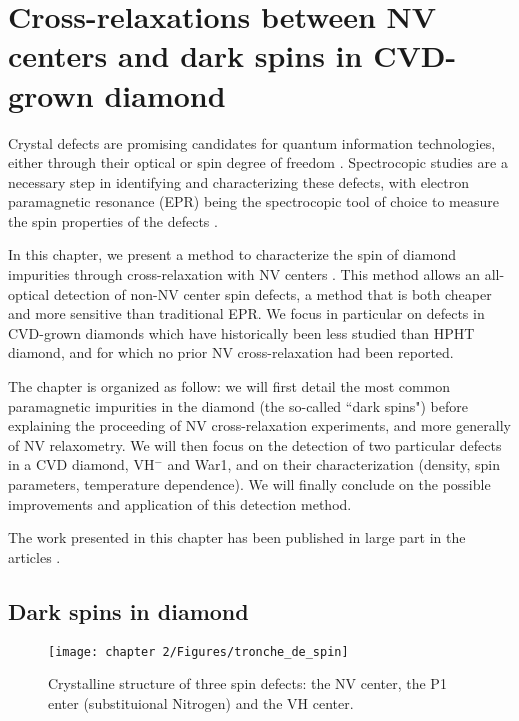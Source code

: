 \documentclass[a4paper, 11pt]{book}
\begin{document}
\chapter{Cross-relaxations between NV centers and dark spins in CVD-grown diamond}
Crystal defects are promising candidates for quantum information technologies, either through their optical or spin degree of freedom \citep{aharonovich2016solid, atature2018material, bassett2019quantum}. Spectrocopic studies are a necessary step in identifying and characterizing these defects, with electron paramagnetic resonance (EPR) being the spectrocopic tool of choice to measure the spin properties of the defects \citep{newton2007epr}. 

In this chapter, we present a method to characterize the spin of diamond impurities through cross-relaxation with NV centers \citep{hall2016detection,pellet2021optical}. This method allows an all-optical detection of non-NV center spin defects, a method that is both cheaper and more sensitive than traditional EPR. We focus in particular on defects in CVD-grown diamonds which have historically been less studied than HPHT diamond, and for which no prior NV cross-relaxation had been reported. 

The chapter is organized as follow: we will first detail the most common paramagnetic impurities in the diamond (the so-called ``dark spins") before explaining the proceeding of NV cross-relaxation experiments, and more generally of NV relaxometry. We will then focus on the detection of two particular defects in a CVD diamond, VH$^-$ and War1, and on their characterization (density, spin parameters, temperature dependence). We will finally conclude on the possible improvements and application of this detection method.

The work presented in this chapter has been published in large part in the articles \citep{pellet2021optical, ngambou2022improving}.


\section{Dark spins in diamond}

\begin{figure}[h!]
\centering
\texttt{[image: chapter 2/Figures/tronche\_de\_spin]}
\caption{Crystalline structure of three spin defects: the NV center, the P1 enter (substituional Nitrogen) and the VH center.} 
\label{repr NV P1 VH}
\end{figure}
\end{document}

